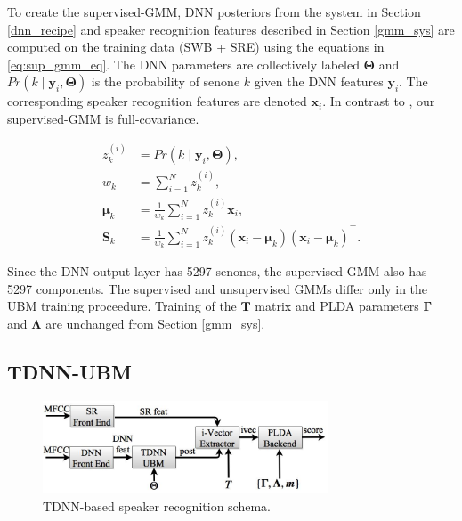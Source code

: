 \documentclass{article}
\begin{document}
To create the supervised-GMM, DNN posteriors from the system in Section \ref{dnn_recipe}
and speaker recognition
features described in Section \ref{gmm_sys} are computed on the training data (SWB + SRE)
 using the
equations in \ref{eq:sup_gmm_eq}. The DNN parameters are collectively
labeled $\boldsymbol{\Theta}$ and 
$Pr(k \mid \boldsymbol{y}_{i}, \boldsymbol{\Theta})$ is the
probability of senone $k$ given the DNN features $\boldsymbol{y}_{i}$. The
corresponding speaker recognition features are denoted $\boldsymbol{x}_{i}$.
In contrast to \cite{lei2014}, our supervised-GMM is full-covariance.

\begin{equation}
\label{eq:sup_gmm_eq} 
\begin{split}
z_{k}^{(i)} &= Pr(k \mid \boldsymbol{y}_{i}, \boldsymbol{\Theta}), \\
w_{k} &= \sum_{i=1}^{N}z_{k}^{(i)},\\
\boldsymbol{\mu}_{k} &= \frac{1}{w_{k}} \sum_{i=1}^{N} z_{k}^{(i)} \boldsymbol{x}_{i},\\
\boldsymbol{S}_{k} &= \frac{1}{w_{k}} \sum_{i=1}^{N} z_{k}^{(i)} (\boldsymbol{x}_{i} - \boldsymbol{\mu}_{k}) (\boldsymbol{x}_{i} - \boldsymbol{\mu}_{k})^{\top}.
\end{split}
\end{equation}

Since the DNN output layer has 5297 senones, the supervised GMM also has 5297
components. The supervised and unsupervised GMMs differ only
in the UBM training proceedure. Training of the $\boldsymbol{T}$ matrix
and PLDA parameters $\boldsymbol{\Gamma}$ and $\boldsymbol{\Lambda}$ are unchanged from Section \ref{gmm_sys}.

\subsection{TDNN-UBM}

\begin{figure}[th]
\centerline{\includegraphics[width=8.5cm]{fig/dnn_schema}}
\caption{TDNN-based speaker recognition schema.}
\label{fig:dnn_schema}
\end{figure}

\end{document}
